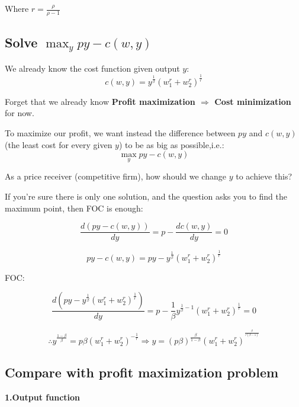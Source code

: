 \documentclass{article}
\begin{document}
Where $r = \frac{\rho}{\rho -1}$

\subsection{Solve $\max_y py - c(w, y)$ }

\begin{mdframed}[backgroundcolor=blue!20,linecolor=white]

We already know the cost function given output $y$:
$$c(w,y) = y^{\frac{1}{\beta}}{(w_1^r + w_2^r)^{\frac{1}{r}}} $$

Forget that we already know \textbf{Profit maximization $\Rightarrow$  Cost minimization} for now.

To maximize our profit, we want instead the difference between $py$ and $c(w,y)$ \\ (the least cost for every given $y$) to be as big as possible,i.e.:
$$\max_{y} py - c(w,y)$$

As a price receiver (competitive firm), how should we change $y$ to achieve this?

If you're sure there is only one solution, and the question asks you to find the maximum point, then FOC is enough:

$$\frac{d(py - c(w,y))}{dy} = p - \frac{dc(w,y)}{dy}=0$$


\end{mdframed}

$$py - c(w, y) = py - y^{\frac{1}{\beta}}{(w_1^r + w_2^r)^{\frac{1}{r}}} $$

FOC:

$$\frac{d(py - y^{\frac{1}{\beta}}{(w_1^r + w_2^r)^{\frac{1}{r}}})}{dy}= p - \frac{1}{\beta}y^{\frac{1}{\beta} - 1} (w_1^r + w_2^r)^{\frac{1}{r}} = 0$$

\begin{equation}
\therefore y^{\frac{1- \beta}{\beta}} = p \beta (w_1^r + w_2^r)^{-\frac{1}{r}}  \Rightarrow y =  (p \beta)^{\frac{\beta}{1- \beta}} (w_1^r + w_2^r)^{^{\frac{\beta}{r(\beta - 1)}}}
    \label{eq:check1}   
\end{equation}

\subsection{Compare with profit maximization problem}

\textbf{1.Output function}
\end{document}
